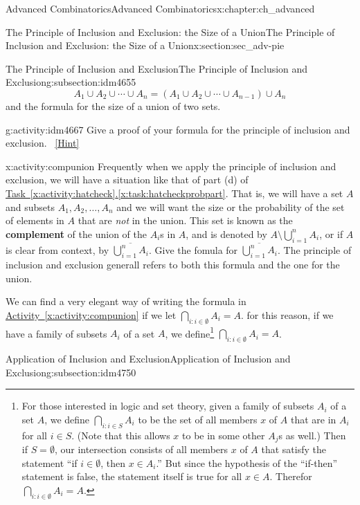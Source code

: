 \documentclass[oneside,10pt,]{book}
\newcommand{\terminology}[1]{\textbf{#1}}
\numberwithin{equation}{chapter}
\begin{document}
\begin{chapterptx}{Advanced Combinatorics}{}{Advanced Combinatorics}{}{}{x:chapter:ch_advanced}
\begin{sectionptx}{The Principle of Inclusion and Exclusion: the Size of a Union}{}{The Principle of Inclusion and Exclusion: the Size of a Union}{}{}{x:section:sec_adv-pie}
\begin{subsectionptx}{The Principle of Inclusion and Exclusion}{}{The Principle of Inclusion and Exclusion}{}{}{g:subsection:idm4655}
\begin{equation*}
A_1 \cup A_2 \cup \cdots \cup A_n = \left(A_1 \cup A_2 \cup \cdots \cup A_{n-1}\right) \cup A_n
\end{equation*}
and the formula for the size of a union of two sets.%
\begin{activity}{}{g:activity:idm4667}%
Give a proof of your formula for the principle of inclusion and exclusion.%
\qquad~\hfill{\tiny\hyperlink{g:hint:idm4670-back}{[Hint]}}\end{activity}
\begin{activity}{}{x:activity:compunion}%
Frequently when we apply the principle of inclusion and exclusion, we will have a situation like that of part (d) of \hyperref[x:task:hatcheckprobpart]{Task~\ref{x:activity:hatcheck}.\ref{x:task:hatcheckprobpart}}.  That is, we will have a set \(A\) and subsets \(A_1, A_2, \ldots, A_n\) and we will want the size or the probability of the set of elements in \(A\) that are \emph{not} in the union.  This set is known as the \terminology{complement}  of the union of the \(A_i\)s in \(A\), and is denoted by \(A \setminus \bigcup_{i=1}^n A_i\), or if \(A\) is clear from context, by \(\overline{\bigcup_{i=1}^n A_i}\). Give the fomula for \(\overline{\bigcup_{i=1}^n A_i}\).  The principle of inclusion and exclusion generall refers to both this formula and the one for the union.%
\end{activity}
We can find a very elegant way of writing the formula in \hyperref[x:activity:compunion]{Activity~\ref{x:activity:compunion}} if we let \(\bigcap_{i:i\in\emptyset}A_i = A\).  for this reason, if we have a family of subsets \(A_i\) of a set \(A\), we define\footnote{For those interested in logic and set theory, given a family of subsets \(A_i\) of a set \(A\), we define \(\bigcap_{i:i\in S}A_i\) to be the set of all members \(x\) of \(A\) that are in \(A_i\) for all \(i \in S\).  (Note that this allows \(x\) to be in some other \(A_j\)s as well.)  Then if \(S = \emptyset\), our intersection consists of all members \(x\) of \(A\) that satisfy the statement ``if \(i\in \emptyset\), then \(x \in A_i\).'' But since the hypothesis of the ``if-then'' statement is false, the statement itself is true for all \(x \in A\).  Therefor \(\bigcap_{i:i \in \emptyset}A_i = A\).\label{g:fn:idm4730}} \(\bigcap_{i:i\in\emptyset}A_i = A\).%
\end{subsectionptx}
%
%
\typeout{************************************************}
\typeout{************************************************}
%
\begin{subsectionptx}{Application of Inclusion and Exclusion}{}{Application of Inclusion and Exclusion}{}{}{g:subsection:idm4750}

\end{subsectionptx}
\end{sectionptx}
\end{chapterptx}
\end{document}
